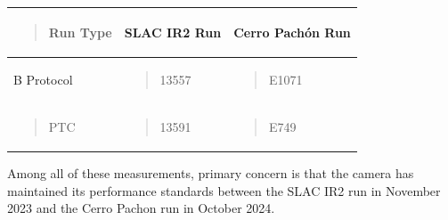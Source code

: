 \begin{longtable}[]{@{}
  >{\raggedright\arraybackslash}p{}
  >{\raggedright\arraybackslash}p{}
  >{\raggedright\arraybackslash}p{}@{}}
\toprule\noalign{}
\begin{minipage}[b]{\linewidth}\raggedright
\begin{quote}
Run Type
\end{quote}
\end{minipage} & \begin{minipage}[b]{\linewidth}\raggedright
SLAC IR2 Run
\end{minipage} & \begin{minipage}[b]{\linewidth}\raggedright
Cerro Pachón Run
\end{minipage} \\
\midrule\noalign{}
\endhead
\bottomrule\noalign{}
\endlastfoot
B Protocol & \begin{minipage}[t]{\linewidth}\raggedright
\begin{quote}
13557
\end{quote}
\end{minipage} & \begin{minipage}[t]{\linewidth}\raggedright
\begin{quote}
E1071
\end{quote}
\end{minipage} \\
\begin{minipage}[t]{\linewidth}\raggedright
\begin{quote}
PTC
\end{quote}
\end{minipage} & \begin{minipage}[t]{\linewidth}\raggedright
\begin{quote}
13591
\end{quote}
\end{minipage} & \begin{minipage}[t]{\linewidth}\raggedright
\begin{quote}
E749
\end{quote}
\end{minipage} \\
\end{longtable}

Among all of these measurements, primary concern is that the camera has
maintained its performance standards between the SLAC IR2 run in
November 2023 and the Cerro Pachon run in October 2024.

